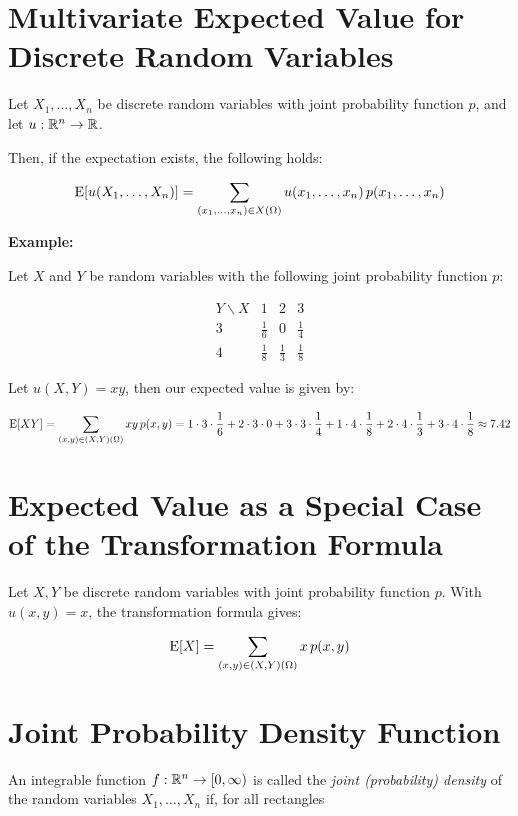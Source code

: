 \section{Multivariate Expected Value for Discrete Random Variables}

Let \( X_1, \ldots, X_n \) be discrete random variables with joint probability function \( p \),
and let \( u : \mathbb{R}^n \to \mathbb{R} \).

Then, if the expectation exists, the following holds:

\[
    \mathrm{E}[u(X_1, \ldots, X_n)]
    = \sum_{(x_1, \ldots, x_n) \in X(\Omega)}
      u(x_1, \ldots, x_n) \, p(x_1, \ldots, x_n)
\]

\textbf{Example:}

Let \( X \) and \( Y \) be random variables with the following joint probability function \( p \):

\[
    \begin{array}{c|ccc}
    Y \backslash X & 1 & 2 & 3 \\
    3 & \frac{1}{6} & 0 & \frac{1}{4} \\
    4 & \frac{1}{8} & \frac{1}{3} & \frac{1}{8}
    \end{array}
\]

Let \(u(X,Y) = xy\), then our expected value is given by: 

\[
    \mathrm{E}[XY] = \sum_{(x,y) \in (X, Y)(\Omega)} xy \, p(x,y)
    = 1 \cdot 3 \cdot \frac{1}{6} + 2 \cdot 3 \cdot 0 + 3 \cdot 3 \cdot \frac{1}{4}
    + 1 \cdot 4 \cdot \frac{1}{8} + 2 \cdot 4 \cdot \frac{1}{3} + 3 \cdot 4 \cdot \frac{1}{8}
    \approx 7.42
\]

\section{Expected Value as a Special Case of the Transformation Formula}

Let \( X, Y \) be discrete random variables with joint probability function \( p \).
With \( u(x, y) = x \), the transformation formula gives:

\[
    \mathrm{E}[X] = \sum_{(x, y) \in (X, Y)(\Omega)} x \, p(x, y)
\]

\section{Joint Probability Density Function}

An integrable function \( f : \mathbb{R}^n \to [0, \infty) \) is called the \emph{joint (probability) density} of the random variables
\( X_1, \ldots, X_n \) if, for all rectangles


